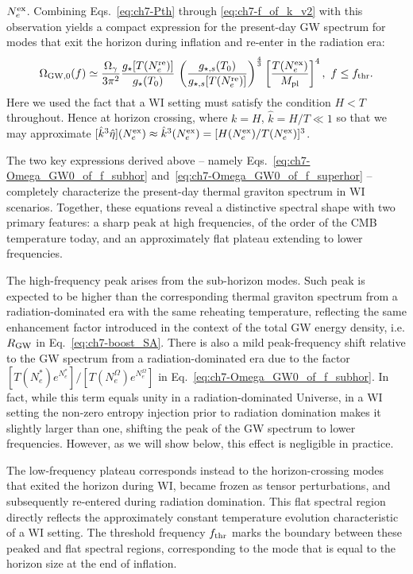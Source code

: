 $N_e^{\rm ex}$. Combining Eqs.~\eqref{eq:ch7-Pth}
through \eqref{eq:ch7-f_of_k_v2} with this observation yields a compact expression for the present-day GW spectrum for modes that exit the horizon during inflation and re-enter in the radiation era:
\begin{equation}
    \Omega_{\rm GW, 0}(f)\simeq \frac{\Omega_\gamma}{3\pi^2}\frac{g_{\star}[T(N^{\rm re}_{e})]}{g_\star(T_0)}\,\left(\frac{g_{\star,s}(T_0)}{g_{\star,s}[T(N^{\rm re}_{e})]}\right)^{\frac{4}{3}} \left[\frac{T(N^{\rm ex}_{e})}{M_{\rm pl}}\right]^4 ,\,\, f\leq f_{\rm thr}.\label{eq:ch7-Omega_GW0_of_f_superhor}
\end{equation}
Here we used the fact that a WI setting must satisfy the condition $H<T$ throughout.
Hence at horizon crossing, where $k=H$, $\hat{k}= H/T\ll 1$ so that we may approximate $[\hat k^3 \hat \eta](N_e^{\rm ex})\approx \hat{k}^3(N_e^{\rm ex})=[H(N_e^{\rm ex})/T(N_e^{\rm ex})]^3$.

The two key expressions derived above -- namely Eqs.~\eqref{eq:ch7-Omega_GW0_of_f_subhor} and~\eqref{eq:ch7-Omega_GW0_of_f_superhor} -- completely characterize the present-day thermal graviton spectrum in WI scenarios. Together, these equations reveal a distinctive spectral shape with two primary features: a sharp peak at high frequencies, of the order of the CMB temperature today, and an approximately flat plateau extending to lower frequencies.

The high-frequency peak arises from the sub-horizon modes. Such peak is expected to be higher than the corresponding thermal graviton spectrum from a radiation-dominated era with the same reheating temperature, reflecting the same enhancement factor introduced in the context of the total GW energy density, i.e. $R_{\rm GW}$ in Eq.~\eqref{eq:ch7-boost_SA}. There is also a mild peak-frequency shift relative to the GW spectrum from a radiation-dominated era due to the factor  $[T(N_e^*)e^{N_e^*}]/[T(N_e^\Omega)e^{N_e^\Omega}]$ in Eq.~\eqref{eq:ch7-Omega_GW0_of_f_subhor}. In fact, while this term equals unity in a radiation-dominated Universe, in a WI setting the non-zero entropy injection prior to radiation domination makes it slightly larger than one, shifting the peak of the GW spectrum to lower frequencies. However, as we will show below, this effect is negligible in practice.

The low-frequency plateau corresponds instead to the horizon-crossing modes that exited the horizon during WI, became frozen as tensor perturbations, and subsequently re-entered during radiation domination. This flat spectral region directly reflects the approximately constant temperature evolution characteristic of a WI setting. The threshold frequency $f_{\rm thr}$ marks the boundary between these peaked and flat spectral regions, corresponding to the mode that is equal to the horizon size at the end of inflation.


